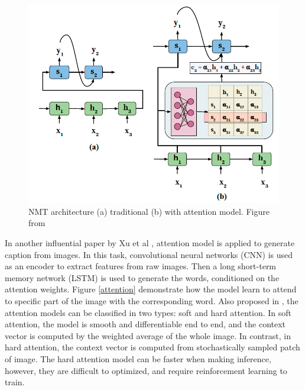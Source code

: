 \documentclass[journal]{IEEEtran}
\begin{document}
\begin{figure}[htb]
  \includegraphics[width=\linewidth]{NMT.png}
  \caption{NMT architecture (a) traditional (b) with attention model.
  Figure from \cite{chaudhari1904attentive}}
  \label{NMT}
\end{figure}

In another influential paper by Xu et al \cite{xu2015show}, attention model is applied to generate caption from images. 
In this task, convolutional neural networks (CNN) is used as an encoder to extract features from raw images.
Then a long short-term memory network (LSTM) is used to generate the words, conditioned on the attention weights.
Figure \ref{attention} demonstrate how the model learn to attend to specific part of the image with the corresponding word. 
Also proposed in \cite{xu2015show}, the attention models can be classified in two types: soft and hard attention. 
In soft attention, the model is smooth and differentiable end to end, and the context vector is computed by the weighted average of the whole image. 
In contrast, in hard attention, the context vector is computed from stochastically sampled patch of image. 
The hard attention model can be faster when making inference, however, they are difficult to optimized, and require reinforcement learning to train.
\end{document}
